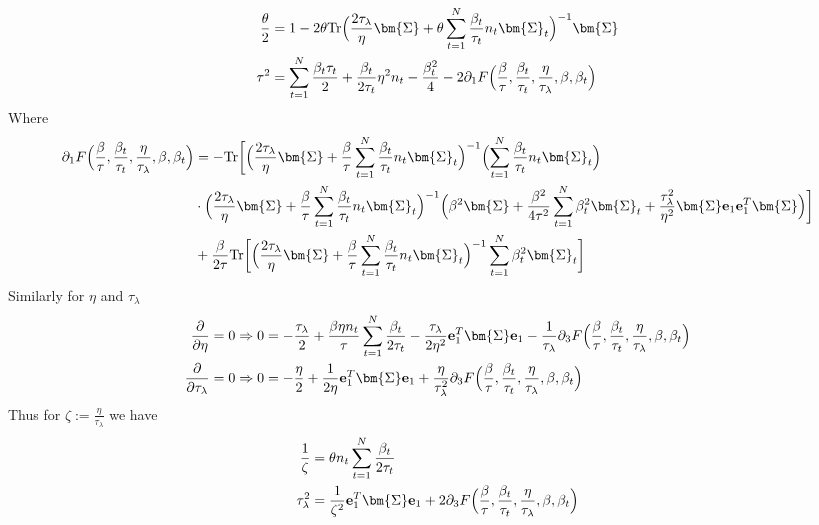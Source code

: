 \documentclass[final]{l4dc2026}
\newcommand{\bSigma}{\bm{\Sigma}}
\newcommand{\be}{\mathbf{e}}
\newcommand{\tr}{\text{Tr}}
\begin{document}
\begin{align*}
    \frac{\theta}{2}  &= 1 - 2 \theta \tr \Bigl(\frac{2\tau_{\lambda}}{\eta}\bSigma+\theta\sum_{t=1}^N \frac{\beta_t}{\tau_t} n_t \bSigma_t \Bigr)^{-1} \bSigma \\
    \tau^2 &= \sum_{t=1}^N \frac{\beta_t \tau_t}{2} + \frac{\beta_t}{2\tau_t} \eta^2 n_t - \frac{\beta_t^2}{4} - 2 \partial_1  F\Bigl(\frac{\beta}{\tau}, \frac{\beta_t}{\tau_t}, \frac{\eta}{\tau_{\lambda}}, \beta, \beta_t\Bigr)
\end{align*}
Where
\begin{align*}
    \partial_1  F\Bigl(\frac{\beta}{\tau}, \frac{\beta_t}{\tau_t}, \frac{\eta}{\tau_{\lambda}}, \beta, \beta_t\Bigr) &= -\tr \biggl[ \Bigl(\frac{2\tau_{\lambda}}{\eta}\bSigma+\frac{\beta}{\tau}\sum_{t=1}^N \frac{\beta_t}{\tau_t} n_t \bSigma_t \Bigr)^{-1} \Bigl(\sum_{t=1}^N \frac{\beta_t}{\tau_t} n_t \bSigma_t \Bigr) \\
    &\cdot\Bigl(\frac{2\tau_{\lambda}}{\eta}\bSigma+\frac{\beta}{\tau}\sum_{t=1}^N \frac{\beta_t}{\tau_t} n_t \bSigma_t \Bigr)^{-1} \Bigl(\beta^2 \bSigma + \frac{\beta^2}{4\tau^2} \sum_{t=1}^N \beta^2_t  \bSigma_t  + \frac{\tau_{\lambda}^2}{\eta^2}\bSigma \be_1 \be_1^T \bSigma\Bigr) \biggr]
    \\
    &+ \frac{\beta}{2\tau} \tr\biggl[ \Bigl(\frac{2\tau_{\lambda}}{\eta}\bSigma+\frac{\beta}{\tau}\sum_{t=1}^N \frac{\beta_t}{\tau_t} n_t \bSigma_t \Bigr)^{-1}  \sum_{t=1}^N \beta^2_t  \bSigma_t \biggr]
\end{align*}
Similarly for $\eta$ and $\tau_{\lambda}$
\begin{align*}
     \frac{\partial}{\partial \eta} &= 0 \Rightarrow 0 = - \frac{\tau_{\lambda}}{2} + \frac{\beta  \eta n_t }{\tau} \sum_{t=1}^N \frac{\beta_t}{2\tau_t} - \frac{\tau_{\lambda}}{2\eta^2} \be_1^T \bSigma \be_1 -\frac{1}{\tau_{\lambda}} \partial_3  F\Bigl(\frac{\beta}{\tau}, \frac{\beta_t}{\tau_t}, \frac{\eta}{\tau_{\lambda}}, \beta, \beta_t\Bigr)  \\
      \frac{\partial}{\partial \tau_{\lambda}} &= 0 \Rightarrow 0 = -\frac{\eta}{2} + \frac{1}{2\eta} \be_1^T \bSigma \be_1
     + \frac{\eta}{\tau_{\lambda}^2} \partial_3  F\Bigl(\frac{\beta}{\tau}, \frac{\beta_t}{\tau_t}, \frac{\eta}{\tau_{\lambda}}, \beta, \beta_t\Bigr) 
\end{align*}
Thus for $\zeta:= \frac{\eta}{\tau_{\lambda}}$ we have
\begin{align*}
    \frac{1}{\zeta} &=  \theta n_t \sum_{t=1}^N \frac{\beta_t}{2\tau_t} \\
    \tau^2_{\lambda} &= \frac{1}{\zeta^2} \be_1^T \bSigma \be_1 + 2\partial_3 F\Bigl(\frac{\beta}{\tau}, \frac{\beta_t}{\tau_t}, \frac{\eta}{\tau_{\lambda}}, \beta, \beta_t\Bigr) 
\end{align*}
\end{document}
